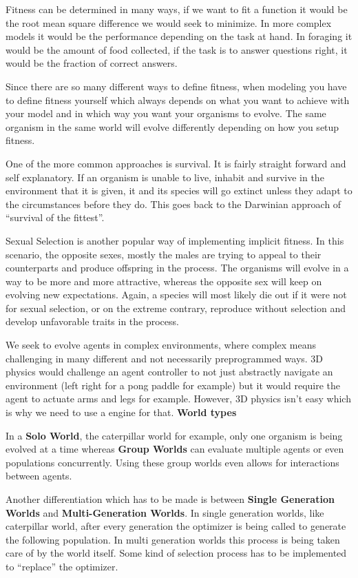 \documentclass[12pt,oneside,listof=totoc,paper=a4,headings=small]{scrbook}
\begin{document}
Fitness can be determined in many ways, if we want to fit a function it would be the root mean square difference we would seek to minimize. In more complex models it would be the performance depending on the task at hand. In foraging it would be the amount of food collected, if the task is to answer questions right, it would be the fraction of correct answers.  

Since there are so many different ways to define fitness, when modeling you have to define fitness yourself which always depends on what you want to achieve with your model and in which way you want your organisms to evolve. The same organism in the same world will evolve differently depending on how you setup fitness.

One of the more common approaches is survival. It is fairly straight forward and self explanatory. If an organism is unable to live, inhabit and survive in the environment that it is given, it and its species will go extinct unless they adapt to the circumstances before they do. This goes back to the Darwinian approach of ``survival of the fittest''.

Sexual Selection is another popular way of implementing implicit fitness. In this scenario, the opposite sexes, mostly the males are trying to appeal to their counterparts and produce offspring in the process. The organisms will evolve in a way to be more and more attractive, whereas the opposite sex will keep on evolving new expectations. Again, a species will most likely die out if it were not for sexual selection, or on the extreme contrary, reproduce without selection and develop unfavorable traits in the process.

We seek to evolve agents in complex environments, where complex means challenging in many different and not necessarily preprogrammed ways. 3D physics would challenge an agent controller to not just abstractly navigate an environment (left right for a pong paddle for example) but it would require the agent to actuate arms and legs for example. However, 3D physics isn't easy which is why we need to use a engine for that.
\textbf{World types}

In a \textbf{Solo World}, the caterpillar world for example, only one organism is being evolved at a time whereas \textbf{Group Worlds} can evaluate multiple agents or even populations concurrently. Using these group worlds even allows for interactions between agents.

Another differentiation which has to be made is between \textbf{Single Generation Worlds} and \textbf{Multi-Generation Worlds}. In single generation worlds, like caterpillar world, after every generation the optimizer is being called to generate the following population. In multi generation worlds this process is being taken care of by the world itself. Some kind of selection process has to be implemented to ``replace'' the optimizer.
\end{document}
